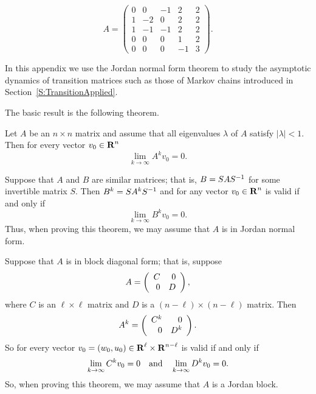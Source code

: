 \begin{exercise} \label{E:jnfmf}
\begin{equation*}
A = \left(\begin{array}{rrrrr} 
     0   &  0  &  -1  &   2   &  2\\
     1   & -2  &   0   &  2   &  2\\
     1   & -1  &  -1   &  2   &  2\\
     0   &  0  &   0   &  1   &  2\\
     0   &  0  &   0   & -1   &  3
 \end{array}\right). 
\end{equation*}
\end{exercise}



\label{S:TransitionTheory} 

In this appendix we use the Jordan normal form theorem to study the asymptotic
dynamics of transition matrices such as those of 
Markov chains introduced in 
Section~\ref{S:TransitionApplied}.

The basic result is the following theorem.
\begin{thm} \label{T:convergeto0}
Let $A$ be an $n\times n$ matrix and assume that all eigenvalues $\lambda$ of 
$A$ satisfy $|\lambda|<1$.  Then for every vector $v_0\in\mbox{$\bf{R}$}^n$
\begin{equation}  \label{E:convergeto0}
\lim_{k\to\infty} A^kv_0 = 0.
\end{equation}
\end{thm}

\proof  Suppose that $A$ and $B$ are similar matrices; that is, $B=SAS^{-1}$
for some invertible matrix $S$.  Then $B^k = SA^kS^{-1}$ and for any vector 
$v_0\in\mbox{$\bf{R}$}^n$  is valid if and only if
\[
\lim_{k\to\infty} B^kv_0 = 0.
\]
Thus, when proving this theorem, we may assume that $A$ is in Jordan normal
form.

Suppose that $A$ is in block diagonal form; that is, suppose
\[
A=\left(\begin{array}{rr} C & 0\\ 0 &D\end{array}\right),
\]
where $C$ is an $\ell\times\ell$ matrix and $D$ is a $(n-\ell)\times (n-\ell)$
matrix.  Then 
\[
A^k = \left(\begin{array}{rr} C^k & 0\\ 0 &D^k\end{array}\right).
\]
So for every vector $v_0=(w_0,u_0)\in\mbox{$\bf{R}$}^\ell\times\mbox{$\bf{R}$}^{n-\ell}$ 
 is valid if and only if 
\[
\lim_{k\to\infty} C^kv_0 = 0 \quad\mbox{and}\quad \lim_{k\to\infty} D^kv_0 = 0.
\]
So, when proving this theorem, we may assume that $A$ is a Jordan block.

